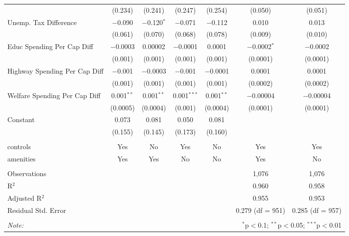\begin{table}[!htbp]
\begin{tabular}{@{\extracolsep{5pt}}lcccccc}
  & (0.234) & (0.241) & (0.247) & (0.254) & (0.050) & (0.051) \\ 
  Unemp. Tax Difference & $-$0.090 & $-$0.120$^{*}$ & $-$0.071 & $-$0.112 & 0.010 & 0.013 \\ 
  & (0.061) & (0.070) & (0.068) & (0.078) & (0.009) & (0.010) \\ 
  Educ Spending Per Cap Diff & $-$0.0003 & 0.00002 & $-$0.0001 & 0.0001 & $-$0.0002$^{*}$ & $-$0.0002 \\ 
  & (0.001) & (0.001) & (0.001) & (0.001) & (0.0001) & (0.0001) \\ 
  Highway Spending Per Cap Diff & $-$0.001 & $-$0.0003 & $-$0.001 & $-$0.0001 & 0.0001 & 0.0001 \\ 
  & (0.001) & (0.001) & (0.001) & (0.001) & (0.0002) & (0.0002) \\ 
  Welfare Spending Per Cap Diff & 0.001$^{**}$ & 0.001$^{**}$ & 0.001$^{***}$ & 0.001$^{**}$ & $-$0.00004 & $-$0.00004 \\ 
  & (0.0005) & (0.0004) & (0.001) & (0.0004) & (0.0001) & (0.0001) \\ 
  Constant & 0.073 & 0.081 & 0.050 & 0.081 &  &  \\ 
  & (0.155) & (0.145) & (0.173) & (0.160) &  &  \\ 
 \hline \\[-1.8ex] 
controls & Yes & No & Yes & No & Yes & Yes \\ 
amenities & Yes & Yes & No & No & Yes & No \\ 
\hline \\[-1.8ex] 
Observations &  &  &  &  & 1,076 & 1,076 \\ 
R$^{2}$ &  &  &  &  & 0.960 & 0.958 \\ 
Adjusted R$^{2}$ &  &  &  &  & 0.955 & 0.953 \\ 
Residual Std. Error &  &  &  &  & 0.279 (df = 951) & 0.285 (df = 957) \\ 
\hline 
\hline \\[-1.8ex] 
\textit{Note:}  & \multicolumn{6}{r}{$^{*}$p$<$0.1; $^{**}$p$<$0.05; $^{***}$p$<$0.01} \\ 
\end{tabular} 
\end{table} 
